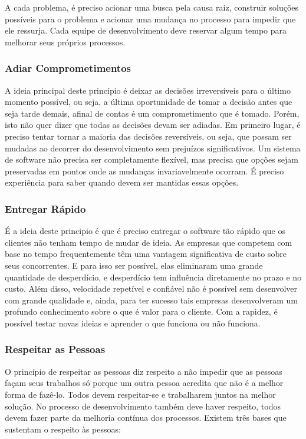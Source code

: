 A cada problema, é preciso acionar uma busca pela causa raiz, construir soluções possíveis para o problema e acionar uma mudança no processo para impedir que ele ressurja. Cada equipe de desenvolvimento deve reservar algum tempo para melhorar seus próprios processos.

\subsubsection[Adiar Comprometimentos]{Adiar Comprometimentos}

A ideia principal deste princípio é deixar as decisões irreversíveis para o último momento possível, ou seja, a última oportunidade de tomar a decisão antes que seja tarde demais, afinal de contas é um comprometimento que é tomado. Porém, isto não quer dizer que todas as decisões devam ser adiadas. Em primeiro lugar, é preciso tentar tornar a maioria das decisões reversíveis, ou seja, que possam ser mudadas ao decorrer do desenvolvimento sem prejuízos significativos. Um sistema de software não precisa ser completamente flexível, mas precisa que opções sejam preservadas em pontos onde as mudanças invariavelmente ocorram. É preciso experiência para saber quando devem ser mantidas essas opções.

\subsubsection[Entregar Rápido]{Entregar Rápido}

É a ideia deste principio é que é preciso entregar o software tão rápido que os clientes não tenham tempo de mudar de ideia.  As empresas que competem com base no tempo frequentemente têm uma vantagem significativa de custo sobre seus concorrentes. E para isso ser possível, elas eliminaram uma grande quantidade de desperdício, e desperdício tem influência diretamente no prazo e no custo. Além disso, velocidade repetível e confiável não é possível sem desenvolver com grande qualidade e, ainda, para ter sucesso tais empresas desenvolveram um profundo conhecimento sobre o que é valor para o cliente. Com a rapidez, é possível testar novas ideias e aprender o que funciona ou não funciona. 

\subsubsection[Respeitar as Pessoas]{Respeitar as Pessoas}

O princípio de respeitar as pessoas diz respeito a não impedir que as pessoas façam seus trabalhos só porque um outra pessoa acredita que não é a melhor forma de fazê-lo. Todos devem respeitar-se e trabalharem juntos na melhor solução. No processo de desenvolvimento também deve haver respeito, todos devem fazer parte da melhoria contínua dos processos. Existem três bases que sustentam o respeito às pessoas:

